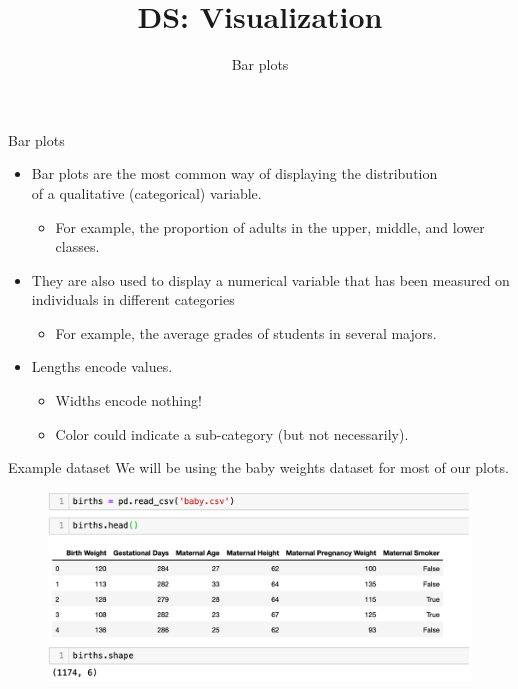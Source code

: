 \documentclass[aspectratio=169]{../latex_main/tntbeamer}  %
\title[Visualization]{DS: Visualization}
\subtitle{Bar plots}
\begin{document}
	
	\maketitle
	\begin{frame}{Bar plots}
	    \begin{itemize}
	        \item Bar plots are the most common way of displaying the distribution\\ of a qualitative (categorical) variable.
	        \begin{itemize}
	            \item For example, the proportion of adults in the upper, middle, and lower classes.
	        \end{itemize}
	        \pause
	        \item They are also used to display a numerical variable that has been measured on individuals in different categories
	        \begin{itemize}
	            \item For example, the average grades of students in several majors.
	       \end{itemize}
	        \pause
	        \item Lengths encode values.
	        \begin{itemize}
	            \item Widths encode nothing!
	            \item Color could indicate a sub-category (but not necessarily).
	        \end{itemize}
	    \end{itemize}
	\end{frame}
	
	
	
	\begin{frame}{Example dataset}
	    We will be using the baby weights dataset for most of our plots.
	    \begin{figure}
	        \centering
            \includegraphics[scale=.45]{Bild21}
	    \end{figure}
	\end{frame}
	
\end{document}
